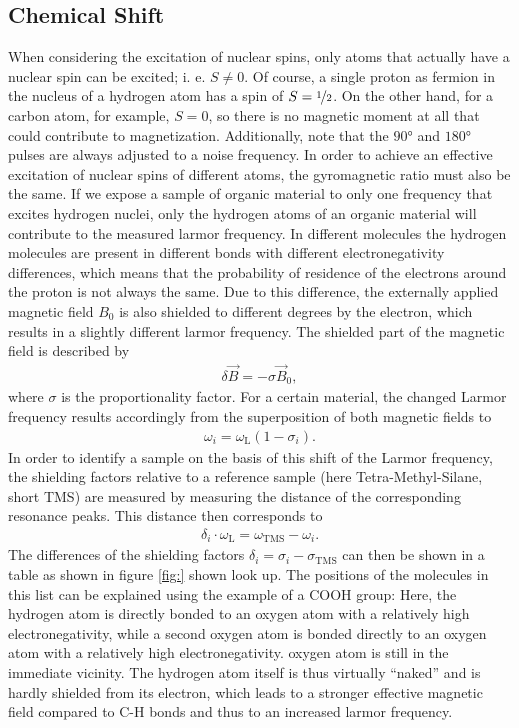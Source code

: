 \subsection{Chemical Shift}
When considering the excitation of nuclear spins, only atoms that actually have a nuclear spin can be excited; i. e. $S\neq 0$.
Of course, a single proton as fermion in the nucleus of a hydrogen atom has a spin of $S = \nicefrac{1}{2}$.
On the other hand, for a carbon atom, for example, $S = 0$, so there is no magnetic moment at all that could contribute to magnetization.
Additionally, note that the $\ang{90}$ and $\ang{180}$ pulses are always adjusted to a noise frequency.
In order to achieve an effective excitation of nuclear spins of different atoms, the gyromagnetic ratio must also be the same.
If we expose a sample of organic material to only one frequency that excites hydrogen nuclei, only the hydrogen atoms of an organic material will contribute to the measured larmor frequency.
In different molecules the hydrogen molecules are present in different bonds with different electronegativity differences, which means that the probability of residence of the electrons around the proton is not always the same.
Due to this difference, the externally applied magnetic field $B_0$ is also shielded to different degrees by the electron, which results in a slightly different larmor frequency.
The shielded part of the magnetic field is described by
\begin{align}
\delta\vec{B}=-\sigma\vec{B}_0,
\end{align}
where $\sigma$ is the proportionality factor.
For a certain material, the changed Larmor frequency results accordingly from the superposition of both magnetic fields to
\begin{align}
\omega_i=\omega_\text{L}(1-\sigma_i).
\end{align}
In order to identify a sample on the basis of this shift of the Larmor frequency, the shielding factors relative to a reference sample (here Tetra-Methyl-Silane, short TMS) are measured by measuring the distance of the corresponding resonance peaks.
This distance then corresponds to
\begin{align}
\delta_i\cdot\omega_\text{L}=\omega_\text{TMS}-\omega_i.
\end{align}
The differences of the shielding factors $\delta_i =\sigma_i-\sigma_\text{TMS}$ can then be shown in a table as shown in figure \ref{fig:} shown look up.
The positions of the molecules in this list can be explained using the example of a COOH group:
Here, the hydrogen atom is directly bonded to an oxygen atom with a relatively high electronegativity, while a second oxygen atom is bonded directly to an oxygen atom with a relatively high electronegativity.
oxygen atom is still in the immediate vicinity.
The hydrogen atom itself is thus virtually \enquote{naked} and is hardly shielded from its electron, which leads to a stronger effective magnetic field compared to C-H bonds and thus to an increased larmor frequency. 



